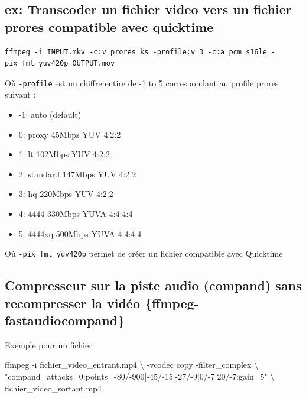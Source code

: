 \documentclass[
  french,
]{book}
\newenvironment{Shaded}{\begin{snugshade}}{\end{snugshade}}
\newcommand{\AttributeTok}[1]{\textcolor[rgb]{0.77,0.63,0.00}{#1}}
\newcommand{\DataTypeTok}[1]{\textcolor[rgb]{0.13,0.29,0.53}{#1}}
\newcommand{\ExtensionTok}[1]{#1}
\newcommand{\NormalTok}[1]{#1}
\newcommand{\StringTok}[1]{\textcolor[rgb]{0.31,0.60,0.02}{#1}}
\providecommand{\tightlist}{%
  \setlength{\itemsep}{0pt}\setlength{\parskip}{0pt}}
\begin{document}
\hypertarget{ex-transcoder-un-fichier-video-vers-un-fichier-prores-compatible-avec-quicktime}{%
\subsection{ex: Transcoder un fichier video vers un fichier prores compatible avec quicktime}\label{ex-transcoder-un-fichier-video-vers-un-fichier-prores-compatible-avec-quicktime}}

\begin{verbatim}
ffmpeg -i INPUT.mkv -c:v prores_ks -profile:v 3 -c:a pcm_s16le -pix_fmt yuv420p OUTPUT.mov
\end{verbatim}

Où \texttt{-profile} est un chiffre entire de -1 to 5 correspondant au profile prores suivant :

\begin{itemize}
\tightlist
\item
  -1: auto (default)
\item
  0: proxy 45Mbps YUV 4:2:2
\item
  1: lt 102Mbps YUV 4:2:2
\item
  2: standard 147Mbps YUV 4:2:2
\item
  3: hq 220Mbps YUV 4:2:2
\item
  4: 4444 330Mbps YUVA 4:4:4:4
\item
  5: 4444xq 500Mbps YUVA 4:4:4:4
\end{itemize}

Où \texttt{-pix\_fmt\ yuv420p} permet de créer un fichier compatible avec Quicktime

\hypertarget{compresseur-sur-la-piste-audio-compand-sans-recompresser-la-viduxe9o-ffmpeg-fastaudiocompand}{%
\subsection{Compresseur sur la piste audio (compand) sans recompresser la vidéo \{ffmpeg-fastaudiocompand\}}\label{compresseur-sur-la-piste-audio-compand-sans-recompresser-la-viduxe9o-ffmpeg-fastaudiocompand}}

Exemple pour un fichier

\begin{Shaded}
\begin{Highlighting}[]
 \ExtensionTok{ffmpeg} \AttributeTok{{-}i}\NormalTok{ fichier\_video\_entrant.mp4 }\DataTypeTok{\textbackslash{}}
 \AttributeTok{{-}vcodec}\NormalTok{ copy  }\AttributeTok{{-}filter\_complex} \DataTypeTok{\textbackslash{}}
 \StringTok{"compand=attacks=0:points={-}80/{-}900|{-}45/{-}15|{-}27/{-}9|0/{-}7|20/{-}7:gain=5"} \DataTypeTok{\textbackslash{}}
\NormalTok{ fichier\_video\_sortant.mp4}
\end{Highlighting}
\end{Shaded}
\end{document}
